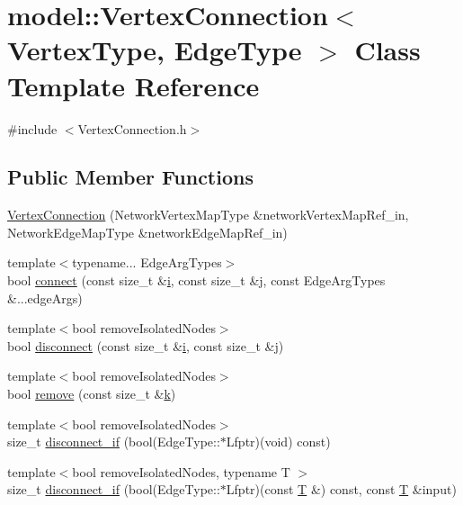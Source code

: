 \hypertarget{classmodel_1_1_vertex_connection}{}\section{model\+:\+:Vertex\+Connection$<$ Vertex\+Type, Edge\+Type $>$ Class Template Reference}
\label{classmodel_1_1_vertex_connection}


{\ttfamily \#include $<$Vertex\+Connection.\+h$>$}

\subsection*{Public Member Functions}
\begin{DoxyCompactItemize}
\item 
\hyperlink{classmodel_1_1_vertex_connection_a1623fe02152b194a824c194ce085537c}{Vertex\+Connection} (Network\+Vertex\+Map\+Type \&network\+Vertex\+Map\+Ref\+\_\+in, Network\+Edge\+Map\+Type \&network\+Edge\+Map\+Ref\+\_\+in)
\item 
{\footnotesize template$<$typename... Edge\+Arg\+Types$>$ }\\bool \hyperlink{classmodel_1_1_vertex_connection_a8acc4f9d2a013525a5a9de917bde07a9}{connect} (const size\+\_\+t \&\hyperlink{_cubic_spline_intersection_8m_a6f6ccfcf58b31cb6412107d9d5281426}{i}, const size\+\_\+t \&j, const Edge\+Arg\+Types \&...edge\+Args)
\item 
{\footnotesize template$<$bool remove\+Isolated\+Nodes$>$ }\\bool \hyperlink{classmodel_1_1_vertex_connection_ab8f25ac7237d0ea86c6ca976af651ddc}{disconnect} (const size\+\_\+t \&\hyperlink{_cubic_spline_intersection_8m_a6f6ccfcf58b31cb6412107d9d5281426}{i}, const size\+\_\+t \&j)
\item 
{\footnotesize template$<$bool remove\+Isolated\+Nodes$>$ }\\bool \hyperlink{classmodel_1_1_vertex_connection_a9053fbcc84b52855ab34e80663c9acd3}{remove} (const size\+\_\+t \&\hyperlink{_f_e_m_2linear__elasticity__3d_2tetgen_2generate_p_o_l_ycube_8m_a5d2aad4440da75aa43f2643e72b1a3bd}{k})
\item 
{\footnotesize template$<$bool remove\+Isolated\+Nodes$>$ }\\size\+\_\+t \hyperlink{classmodel_1_1_vertex_connection_add21bc09ceaeebb26451a991cec66f94}{disconnect\+\_\+if} (bool(Edge\+Type\+::$\ast$Lfptr)(void) const)
\item 
{\footnotesize template$<$bool remove\+Isolated\+Nodes, typename T $>$ }\\size\+\_\+t \hyperlink{classmodel_1_1_vertex_connection_aaaa0e48d4372180a6129f7aa935f0661}{disconnect\+\_\+if} (bool(Edge\+Type\+::$\ast$Lfptr)(const \hyperlink{_spline_node_base__corder1_8h_a82692d3a5502b91460591f1d5504314a}{T} \&) const, const \hyperlink{_spline_node_base__corder1_8h_a82692d3a5502b91460591f1d5504314a}{T} \&input)
\end{DoxyCompactItemize}


